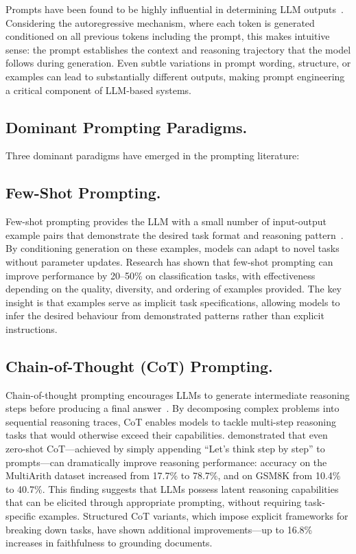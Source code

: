 
Prompts have been found to be highly influential in determining LLM outputs~\citep{brown2020language, wei2022chain}. Considering the autoregressive mechanism, where each token is generated conditioned on all previous tokens including the prompt, this makes intuitive sense: the prompt establishes the context and reasoning trajectory that the model follows during generation. Even subtle variations in prompt wording, structure, or examples can lead to substantially different outputs, making prompt engineering a critical component of LLM-based systems.

\subsection{Dominant Prompting Paradigms.}

Three dominant paradigms have emerged in the prompting literature:

\subsection{Few-Shot Prompting.}
Few-shot prompting provides the LLM with a small number of input-output example pairs that demonstrate the desired task format and reasoning pattern~\citep{brown2020language}. By conditioning generation on these examples, models can adapt to novel tasks without parameter updates. Research has shown that few-shot prompting can improve performance by 20--50\% on classification tasks, with effectiveness depending on the quality, diversity, and ordering of examples provided. The key insight is that examples serve as implicit task specifications, allowing models to infer the desired behaviour from demonstrated patterns rather than explicit instructions.

\subsection{Chain-of-Thought (CoT) Prompting.}
Chain-of-thought prompting encourages LLMs to generate intermediate reasoning steps before producing a final answer~\citep{wei2022chain}. By decomposing complex problems into sequential reasoning traces, CoT enables models to tackle multi-step reasoning tasks that would otherwise exceed their capabilities. \citet{kojima2022large} demonstrated that even zero-shot CoT---achieved by simply appending ``Let's think step by step'' to prompts---can dramatically improve reasoning performance: accuracy on the MultiArith dataset increased from 17.7\% to 78.7\%, and on GSM8K from 10.4\% to 40.7\%. This finding suggests that LLMs possess latent reasoning capabilities that can be elicited through appropriate prompting, without requiring task-specific examples. Structured CoT variants, which impose explicit frameworks for breaking down tasks, have shown additional improvements---up to 16.8\% increases in faithfulness to grounding documents.

